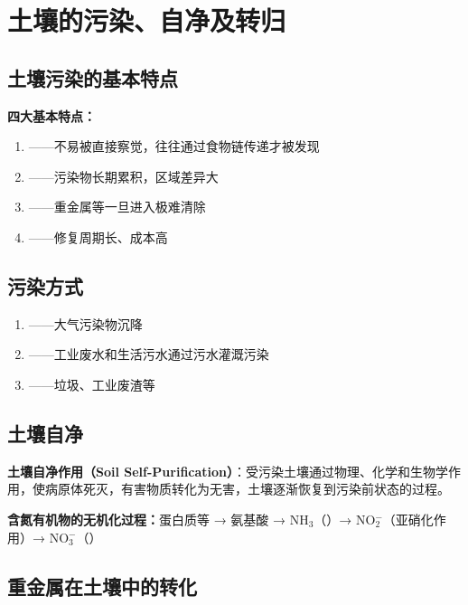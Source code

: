 \documentclass[10pt,a4paper,oneside]{ctexbook}
\begin{document}
\section{土壤的污染、自净及转归}

\subsection{土壤污染的基本特点}

\begin{keybox}
\textbf{四大基本特点：}
\begin{enumerate}[leftmargin=*]
    \item {}——不易被直接察觉，往往通过食物链传递才被发现
    \item {}——污染物长期累积，区域差异大
    \item {}——重金属等一旦进入极难清除
    \item {}——修复周期长、成本高
\end{enumerate}
\end{keybox}

\subsection{污染方式}

\begin{enumerate}[leftmargin=*]
    \item {}——大气污染物沉降
    \item {}——工业废水和生活污水通过污水灌溉污染
    \item {}——垃圾、工业废渣等
\end{enumerate}

\subsection{土壤自净}

\begin{defbox}
\textbf{土壤自净作用（Soil Self-Purification）}：受污染土壤通过物理、化学和生物学作用，使病原体死灭，有害物质转化为无害，土壤逐渐恢复到污染前状态的过程。
\end{defbox}

\textbf{含氮有机物的无机化过程：}蛋白质等 → 氨基酸 → NH$_3$（）→ NO$_2^-$（亚硝化作用）→ NO$_3^-$（）

\subsection{重金属在土壤中的转化}
\end{document}
